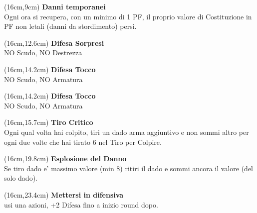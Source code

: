 \documentclass[a4paper,12 pt,openany]{book}
\begin{document}
		\begin{textblock*}{4cm}(16cm,9cm) %
		{\footnotesize
\textbf{Danni temporanei}\\ Ogni ora si recupera, con un minimo di 1 PF, il proprio valore di Costituzione in PF non letali (danni da stordimento) persi.}
	\end{textblock*}


\begin{textblock*}{4cm}(16cm,12.6cm) %
\textbf{Difesa Sorpresi}\\NO Scudo, NO Destrezza
\end{textblock*}

\begin{textblock*}{4cm}(16cm,14.2cm) %
\textbf{Difesa Tocco}\\ NO Scudo, NO Armatura
\end{textblock*}



\begin{textblock*}{4cm}(16cm,14.2cm) %
	\textbf{Difesa Tocco}\\ NO Scudo, NO Armatura
\end{textblock*}


\begin{textblock*}{4cm}(16cm,15.7cm) %
\textbf{Tiro Critico}\\
Ogni qual volta hai colpito, tiri un dado arma aggiuntivo e non sommi altro per ogni due volte che hai tirato 6 nel Tiro per Colpire.
\end{textblock*}

\begin{textblock*}{4cm}(16cm,19.8cm) %
\textbf{Esplosione del Danno}\\
Se tiro dado e' massimo valore (min 8) ritiri il dado e sommi ancora il valore (del solo dado).
\end{textblock*}




\begin{textblock*}{4cm}(16cm,23.4cm) %
	\textbf{Mettersi in difensiva}\\
usi una azioni, +2 Difesa fino a inizio round dopo.
\end{textblock*}
\end{document}
